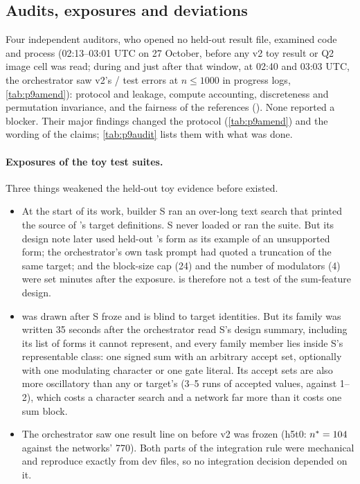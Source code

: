 \subsection{Audits, exposures and deviations}\label{sec:p9audits}

Four independent auditors, who opened no held-out result file, examined code and process (02:13--03:01 UTC on 27 October, before any v2 toy result or Q2 image cell was read; during and just after that window, at 02:40 and 03:03 UTC, the orchestrator saw v2's / test errors at $n\le1000$ in progress logs, \cref{tab:p9amend}): protocol and leakage, compute accounting, discreteness and permutation invariance, and the fairness of the references (). None reported a blocker. Their major findings changed the protocol (\cref{tab:p9amend}) and the wording of the claims; \cref{tab:p9audit} lists them with what was done.

\paragraph{Exposures of the toy test suites.} Three things weakened the held-out toy evidence before  existed.
\begin{itemize}
\item At the start of its work, builder S ran an over-long text search that printed the source of 's target definitions. S never loaded or ran the suite. But its design note later used held-out 's form as its example of an unsupported form; the orchestrator's own task prompt had quoted a truncation of the same target; and the block-size cap (24) and the number of modulators (4) were set minutes after the exposure.  is therefore not a test of the sum-feature design.
\item {} was drawn after S froze and is blind to target identities. But its family was written 35 seconds after the orchestrator read S's design summary, including its list of forms it cannot represent, and every family member lies inside S's representable class: one signed sum with an arbitrary accept set, optionally with one modulating character or one gate literal. Its accept sets are also more oscillatory than any  or  target's (3--5 runs of accepted values, against 1--2), which costs a character search and a network far more than it costs one sum block.
\item The orchestrator saw one  result line on  before v2 was frozen (h5t0: $n^{*}=104$ against the networks' 770). Both parts of the integration rule were mechanical and reproduce exactly from dev files, so no integration decision depended on it.
\end{itemize}

